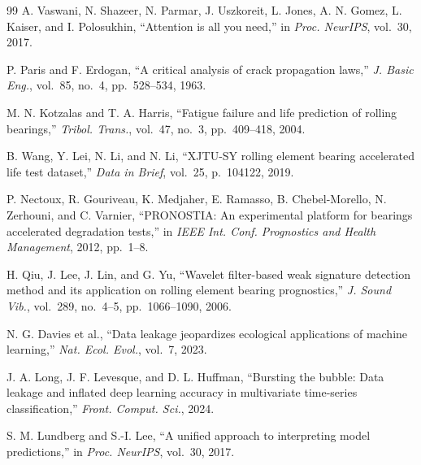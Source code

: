 \documentclass[5p,twocolumn]{elsarticle}
\begin{document}
\begin{thebibliography}{99}
A. Vaswani, N. Shazeer, N. Parmar, J. Uszkoreit, L. Jones, A. N. Gomez, L. Kaiser, and I. Polosukhin,
``Attention is all you need,''
in \textit{Proc. NeurIPS}, vol.~30, 2017.

P. Paris and F. Erdogan,
``A critical analysis of crack propagation laws,''
\textit{J. Basic Eng.}, vol.~85, no.~4, pp.~528--534, 1963.

M. N. Kotzalas and T. A. Harris,
``Fatigue failure and life prediction of rolling bearings,''
\textit{Tribol. Trans.}, vol.~47, no.~3, pp.~409--418, 2004.

B. Wang, Y. Lei, N. Li, and N. Li,
``XJTU-SY rolling element bearing accelerated life test dataset,''
\textit{Data in Brief}, vol.~25, p.~104122, 2019.

P. Nectoux, R. Gouriveau, K. Medjaher, E. Ramasso, B. Chebel-Morello, N. Zerhouni, and C. Varnier,
``PRONOSTIA: An experimental platform for bearings accelerated degradation tests,''
in \textit{IEEE Int. Conf. Prognostics and Health Management}, 2012, pp.~1--8.

H. Qiu, J. Lee, J. Lin, and G. Yu,
``Wavelet filter-based weak signature detection method and its application on rolling element bearing prognostics,''
\textit{J. Sound Vib.}, vol.~289, no.~4--5, pp.~1066--1090, 2006.

N. G. Davies et al.,
``Data leakage jeopardizes ecological applications of machine learning,''
\textit{Nat. Ecol. Evol.}, vol.~7, 2023.

J. A. Long, J. F. Levesque, and D. L. Huffman,
``Bursting the bubble: Data leakage and inflated deep learning accuracy in multivariate time-series classification,''
\textit{Front. Comput. Sci.}, 2024.

S. M. Lundberg and S.-I. Lee,
``A unified approach to interpreting model predictions,''
in \textit{Proc. NeurIPS}, vol.~30, 2017.

\end{thebibliography}
\end{document}
